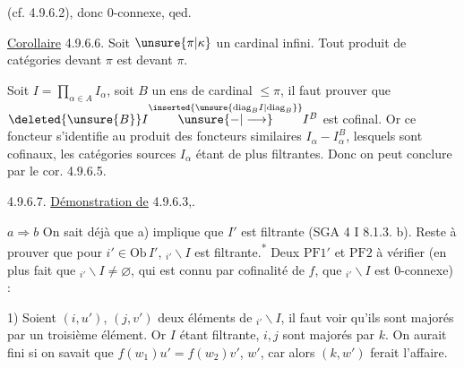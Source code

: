 
(cf. 4.9.6.2), donc $0$-connexe, qed.

\uline{Corollaire} 4.9.6.6. Soit $\unsure{\pi|\kappa}$ un cardinal infini. Tout produit de catégories  devant $\pi$ est  devant $\pi$.

Soit $I=\prod_{\alpha\in A}I_\alpha$, soit $B$ un ens de cardinal $\leq\pi$, il faut prouver que $\deleted{\unsure{B}}I\overset{\inserted{\unsure{\mathrm{diag}_B I|\mathrm{diag}_B}}}{\unsure{\mathbin{-}|\longrightarrow}} I^B$ est cofinal. Or ce foncteur s'identifie au produit des foncteurs similaires $I_\alpha\mathbin{-} I_\alpha^B$, lesquels sont cofinaux, les catégories sources $I_\alpha$ étant de plus filtrantes. Donc on peut conclure par le cor. 4.9.6.5.

4.9.6.7. \uline{Démonstration de} 4.9.6.3,. 

$a\Rightarrow b$ \quad On sait déjà que a) implique que $I'$ est filtrante (SGA 4 I 8.1.3. b). Reste à prouver que pour  $i'\in\mathrm{Ob}\,I'$, $ {}_{i'}\backslash I$ est filtrante.\textsuperscript{*} Deux  $\mathrm{PF}1'$ et $\mathrm{PF}2$ à vérifier (en plus  fait que  $ {}_{i'}\backslash I\ne\varnothing$, qui est connu par cofinalité de $f$,  que $ {}_{i'}\backslash I$ est $0$-connexe) :


1) Soient $(i,u')$, $(j,v')$ deux éléments de $ {}_{i'}\backslash I$, il faut voir qu'ils sont majorés par un troisième élément. Or $I$ étant filtrante, $i,j$ sont majorés par $k$. On aurait fini si on savait que $f(w_1)u'=f(w_2)v'$,  $w'$, car alors $(k,w')$ ferait l'affaire.



